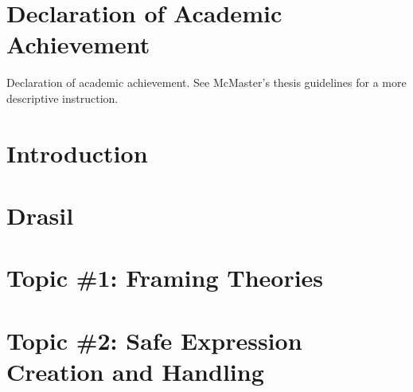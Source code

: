 \documentclass[12pt,oneside]{book}
\begin{document}
\listoflistings


\printacronyms[
  display=all,
  template=tabular,
  heading=chapter,
  name=List of Abbreviations and Symbols
]


\chapter{Declaration of Academic Achievement}

Declaration of academic achievement. See McMaster's thesis guidelines for a more
descriptive instruction.

\label{lastOfFrontMatter}


\mainmatter


\chapter{Introduction}


\chapter{Drasil}


\chapter{Topic \#1: Framing Theories}


\chapter{Topic \#2: Safe Expression Creation and Handling}

\end{document}

